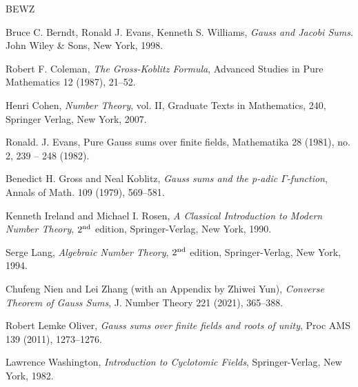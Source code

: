 \documentclass[12pt]{amsart}  \usepackage{amsmath,amssymb,enumerate,amscd,tikz,url}
\numberwithin{equation}{section}
\theoremstyle{definition}
\begin{document}
\begin{thebibliography}{BEWZ}

 Bruce C. Berndt, Ronald J. Evans, Kenneth S. Williams, {\em Gauss and Jacobi Sums}. John Wiley \& Sons, New York, 1998.

 Robert F. Coleman, {\em The Gross-Koblitz Formula}, Advanced Studies in Pure Mathematics 12 (1987), 21--52.

 Henri Cohen, {\em Number Theory}, vol. II, Graduate Texts in Mathematics, 240, Springer Verlag, New York, 2007.


 Ronald. J. Evans, Pure Gauss sums over finite fields, Mathematika 28 (1981), no. 2, 239 -- 248 (1982). 

 Benedict H. Gross and Neal Koblitz, {\em Gauss sums and the \textit{p}-adic $\Gamma$-function}, Annals of Math. 109 (1979), 569--581.

 Kenneth Ireland and Michael I. Rosen, {\em  A Classical Introduction to Modern Number Theory}, $2^{\rm nd}$ edition, Springer-Verlag, New York, 1990. 


 Serge Lang, {\em  Algebraic Number Theory}, $2^{\rm nd}$ edition, Springer-Verlag, New York, 1994.

 Chufeng Nien and Lei Zhang (with an Appendix by Zhiwei Yun), {\em Converse Theorem of Gauss Sums}, J. Number Theory 221 (2021), 365--388.

 Robert Lemke Oliver, {\em Gauss sums over finite fields and roots of unity}, Proc AMS  139 (2011), 1273--1276.

 Lawrence Washington, {\em Introduction to Cyclotomic Fields}, Springer-Verlag, New York, 1982. 
\end{thebibliography}\vfill
\end{document}
